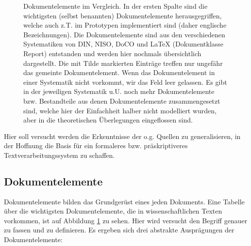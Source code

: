  
\begin{figure}[h!]
\centering
{}
\caption[Dokumentelemente im Vergleich]{ Dokumentelemente im Vergleich. In der ersten Spalte sind die wichtigsten (selbst benannten) Dokumentelemente herausgegriffen, welche auch z.T. im Prototypen implementiert sind (daher englische Bezeichnungen). Die Dokumentelemente sind aus den verschiedenen Systematiken von DIN, NISO, DoCO und LaTeX (Dokumentklasse Report) entstanden und werden hier nochmals übersichtlich dargestellt. Die mit Tilde markierten Einträge treffen nur ungefähr das gemeinte Dokumentelement. Wenn das Dokumentelement in einer Systematik nicht vorkommt, wir das Feld leer gelassen. Es gibt in der jeweiligen Systematik u.U. noch mehr Dokumentelemente bzw. Bestandteile aus denen Dokumentelemente zusammengesetzt sind, welche hier der Einfachheit halber nicht modelliert wurden, aber in die theoretischen Überlegungen eingeflossen sind. }\label{dokumentelemente-fig}
\end{figure}
 
Hier soll versucht werden die Erkenntnisse der o.g. Quellen zu generalisieren, in der Hoffnung die Basis für ein formaleres bzw. präskriptiveres Textverarbeitungssystem zu schaffen.

 
\subsection{Dokumentelemente}\label{dokumentelemente}
 
Dokumentelemente bilden das Grundgerüst eines jeden Dokuments. Eine Tabelle über die wichtigsten Dokumentelemente, die in wissenschaftlichen Texten vorkommen, ist auf Abbildung \ref{dokumentelemente-fig} zu sehen. Hier wird versucht den Begriff genauer zu fassen und zu definieren. Es ergeben sich drei abstrakte Ausprägungen der Dokumentelemente:

